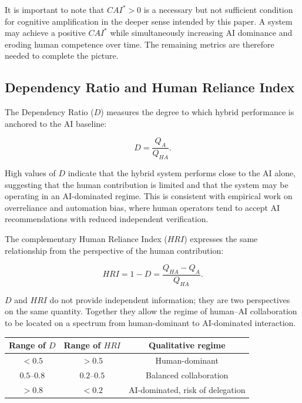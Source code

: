 \documentclass[11pt]{article}
\begin{document}
It is important to note that $CAI^* > 0$ is a necessary but not
sufficient condition for cognitive amplification in the deeper sense
intended by this paper. A system may achieve a positive $CAI^*$ while
simultaneously increasing AI dominance and eroding human competence
over time. The remaining metrics are therefore needed to complete the
picture.

\subsection{Dependency Ratio and Human Reliance Index}

The Dependency Ratio ($D$) measures the degree to which hybrid
performance is anchored to the AI baseline:

\begin{equation}
D = \frac{Q_A}{Q_{HA}}.
\end{equation}

High values of $D$ indicate that the hybrid system performs close to
the AI alone, suggesting that the human contribution is limited and
that the system may be operating in an AI-dominated regime. This is
consistent with empirical work on overreliance and automation bias,
where human operators tend to accept AI recommendations with reduced
independent verification.

The complementary Human Reliance Index ($HRI$) expresses the same
relationship from the perspective of the human contribution:

\begin{equation}
HRI = 1 - D = \frac{Q_{HA} - Q_A}{Q_{HA}}.
\end{equation}

$D$ and $HRI$ do not provide independent information; they are two
perspectives on the same quantity. Together they allow the regime of
human--AI collaboration to be located on a spectrum from
human-dominant to AI-dominated interaction.

\begin{center}
\begin{tabular}{ccc}
\toprule
Range of $D$ & Range of $HRI$ & Qualitative regime \\
\midrule
$< 0.5$      & $> 0.5$        & Human-dominant \\
$0.5$--$0.8$ & $0.2$--$0.5$   & Balanced collaboration \\
$> 0.8$      & $< 0.2$        & AI-dominated, risk of delegation \\
\bottomrule
\end{tabular}
\end{center}
\end{document}
